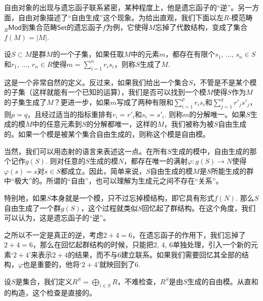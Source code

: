 

自由对象的出现与遗忘函子联系紧密，某种程度上，他是遗忘函子的“逆”。另一方面，自由对象描述了“自由生成”这个现象。为给出直观，我们下面以左$R$-模范畴${}_R\mathsf{Mod}$到集合范畴$\mathsf{Set}$的遗忘函子$f$为例，它使得$M$忘掉了代数结构，变成了集合$f(M)=|M|$. 

\begin{para}
设$S\subset M$是群$M$的一个子集，如果任取$M$中的元素$m$，都存在有限个$s_1$, $\dots$, $s_n\in S$和$r_1$, $\dots$, $r_n\in R$使得$m=\sum_{i=1}^n r_is_i$，则称$S$生成了$M$.
\end{para}

这是一个非常自然的定义。反过来，如果我们给出一个集合$S$，不管是不是某个模的子集（这样就能有一个已知的运算），我们是否可以找到一个模$M$使得$S$作为$M$的子集生成了$M$？更进一步，如果$m$写成了两种有限和$\sum_{i=1}^p r_is_i$和$\sum_{j=1}^q r'_js'_j$，则$p=q$，且经过适当的指标重排有$r_i=r'_i$和$s_i=s'_i$. 则称$m$的分解唯一。如果$S$生成的模$M$中的任意元素到$S$的分解都唯一，这样的$M$，我们被称为被$S$自由生成的。如果一个模是被某个集合自由生成的，则称这个模是自由模。

当然，我们可以用态射的语言来表述这一点。在所有$S$生成的模中，自由生成的那个记作$g(S)$. 则对任意的$S$生成的模$N$，都存在唯一的满射$\varphi:g(S)\to N$使得$\varphi(s)=s$对$s\in S$都成立。因此，简单来说，$S$自由生成的模$M$是$S$所能生成的群中“极大”的。所谓的“自由”，也可以理解为生成元之间不存在“关系”。

特别地，如果$S$本身就是一个模，只不过忘掉模结构，即它具有形式$f(N)$. 那么$S$自由生成了一个群$g(S)$，这个过程就类似$S$回忆起了群结构。在这个角度，我们可以认为，这是遗忘函子的“逆”。

之所以不一定是真正的逆，考虑$2+4=6$，在遗忘函子的作用下，我们忘掉了$2+4=6$，那么在回忆起群结构的时候，只能把$2$, $4$, $6$单独处理，引入一个新的元素`$2+4$'来表示$2+4$的结果，而不与$6$建立联系。如果我们需要回忆其全部的结构，$\varphi$也是重要的，他将`$2+4$'就映回到了$6$.

\begin{para}[自由模的存在性]
设$S$是集合，我们定义$R^S=\bigoplus_{i\in S}R$，不难检查，$R^S$是由$S$生成的自由模。从直和的构造，这个检查是直接的。
\end{para}


